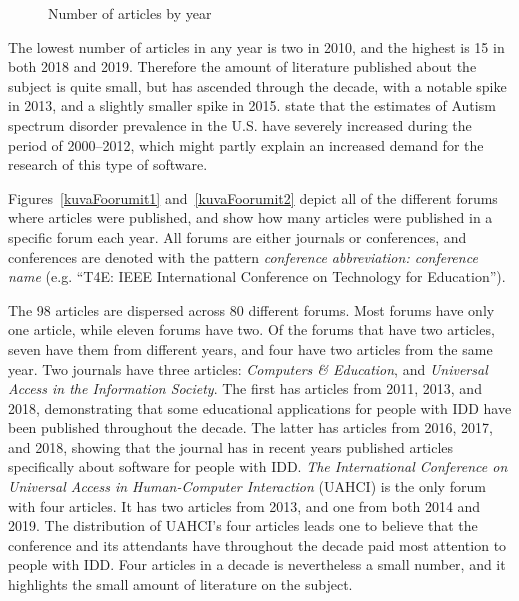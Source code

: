\documentclass[utf8,english]{gradu3}
\begin{document}
\begin{figure}[thb]
  \centering
  \caption{Number of articles by year}
  \label{kuvaVuodet}
\end{figure}

The lowest number of articles in any year is two in 2010,
and the highest is 15 in both 2018 and 2019.
Therefore the amount of literature published about the subject is quite small,
but has ascended through the decade, with a notable spike in 2013, and a slightly smaller spike in 2015.
\textcite{baio2018} state that the estimates of Autism spectrum disorder prevalence in the U.S.
have severely increased during the period of 2000--2012, which might partly explain an increased demand
for the research of this type of software.

Figures~\ref{kuvaFoorumit1} and~\ref{kuvaFoorumit2} depict all of the different forums
where articles were published, and show how many articles were published in a specific forum each year.
All forums are either journals or conferences,
and conferences are denoted with the pattern \textit{conference abbreviation: conference name}
(e.g. ``T4E: IEEE International Conference on Technology for Education'').

The 98 articles are dispersed across 80 different forums.
Most forums have only one article, while eleven forums have two.
Of the forums that have two articles, seven have them from different years,
and four have two articles from the same year.
Two journals have three articles: \textit{Computers \& Education}, and \textit{Universal Access in the Information Society}.
The first has articles from 2011, 2013, and 2018, demonstrating that some educational applications
for people with IDD have been published throughout the decade.
The latter has articles from 2016, 2017, and 2018, showing that the journal has
in recent years published articles specifically about software for people with IDD.
\textit{The International Conference on Universal Access in Human-Computer Interaction} (UAHCI)
is the only forum with four articles. It has two articles from 2013, and one from both 2014 and 2019.
The distribution of UAHCI's four articles leads one to believe that the conference and its attendants
have throughout the decade paid most attention to people with IDD.
Four articles in a decade is nevertheless a small number,
and it highlights the small amount of literature on the subject.
\end{document}
